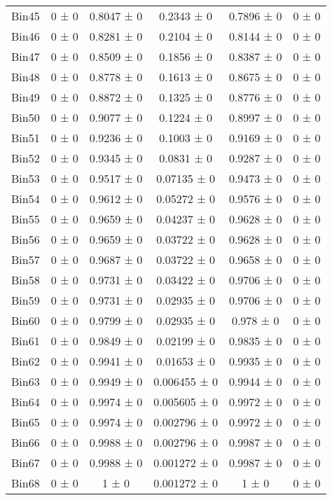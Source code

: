\begin{tabular}{@{\extracolsep{4pt}}lccccc@{}}
     Bin45 & 0 ± 0 & 0.8047 ± 0 & 0.2343 ± 0 & 0.7896 ± 0 & 0 ± 0 \\ 
     Bin46 & 0 ± 0 & 0.8281 ± 0 & 0.2104 ± 0 & 0.8144 ± 0 & 0 ± 0 \\ 
     Bin47 & 0 ± 0 & 0.8509 ± 0 & 0.1856 ± 0 & 0.8387 ± 0 & 0 ± 0 \\ 
     Bin48 & 0 ± 0 & 0.8778 ± 0 & 0.1613 ± 0 & 0.8675 ± 0 & 0 ± 0 \\ 
     Bin49 & 0 ± 0 & 0.8872 ± 0 & 0.1325 ± 0 & 0.8776 ± 0 & 0 ± 0 \\ 
     Bin50 & 0 ± 0 & 0.9077 ± 0 & 0.1224 ± 0 & 0.8997 ± 0 & 0 ± 0 \\ 
     Bin51 & 0 ± 0 & 0.9236 ± 0 & 0.1003 ± 0 & 0.9169 ± 0 & 0 ± 0 \\ 
     Bin52 & 0 ± 0 & 0.9345 ± 0 & 0.0831 ± 0 & 0.9287 ± 0 & 0 ± 0 \\ 
     Bin53 & 0 ± 0 & 0.9517 ± 0 & 0.07135 ± 0 & 0.9473 ± 0 & 0 ± 0 \\ 
     Bin54 & 0 ± 0 & 0.9612 ± 0 & 0.05272 ± 0 & 0.9576 ± 0 & 0 ± 0 \\ 
     Bin55 & 0 ± 0 & 0.9659 ± 0 & 0.04237 ± 0 & 0.9628 ± 0 & 0 ± 0 \\ 
     Bin56 & 0 ± 0 & 0.9659 ± 0 & 0.03722 ± 0 & 0.9628 ± 0 & 0 ± 0 \\ 
     Bin57 & 0 ± 0 & 0.9687 ± 0 & 0.03722 ± 0 & 0.9658 ± 0 & 0 ± 0 \\ 
     Bin58 & 0 ± 0 & 0.9731 ± 0 & 0.03422 ± 0 & 0.9706 ± 0 & 0 ± 0 \\ 
     Bin59 & 0 ± 0 & 0.9731 ± 0 & 0.02935 ± 0 & 0.9706 ± 0 & 0 ± 0 \\ 
     Bin60 & 0 ± 0 & 0.9799 ± 0 & 0.02935 ± 0 & 0.978 ± 0 & 0 ± 0 \\ 
     Bin61 & 0 ± 0 & 0.9849 ± 0 & 0.02199 ± 0 & 0.9835 ± 0 & 0 ± 0 \\ 
     Bin62 & 0 ± 0 & 0.9941 ± 0 & 0.01653 ± 0 & 0.9935 ± 0 & 0 ± 0 \\ 
     Bin63 & 0 ± 0 & 0.9949 ± 0 & 0.006455 ± 0 & 0.9944 ± 0 & 0 ± 0 \\ 
     Bin64 & 0 ± 0 & 0.9974 ± 0 & 0.005605 ± 0 & 0.9972 ± 0 & 0 ± 0 \\ 
     Bin65 & 0 ± 0 & 0.9974 ± 0 & 0.002796 ± 0 & 0.9972 ± 0 & 0 ± 0 \\ 
     Bin66 & 0 ± 0 & 0.9988 ± 0 & 0.002796 ± 0 & 0.9987 ± 0 & 0 ± 0 \\ 
     Bin67 & 0 ± 0 & 0.9988 ± 0 & 0.001272 ± 0 & 0.9987 ± 0 & 0 ± 0 \\ 
     Bin68 & 0 ± 0 & 1 ± 0 & 0.001272 ± 0 & 1 ± 0 & 0 ± 0 \\ 

\end{tabular}
